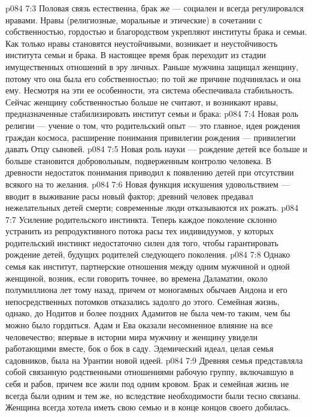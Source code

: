 \vs p084 7:3 Половая связь естественна, брак же --- социален и всегда регулировался нравами. Нравы (религиозные, моральные и этические) в сочетании с собственностью, гордостью и благородством укрепляют институты брака и семьи. Как только нравы становятся неустойчивыми, возникает и неустойчивость института семьи и брака. В настоящее время брак переходит из стадии имущественных отношений в эру личных. Раньше мужчина защищал женщину, потому что она была его собственностью; по той же причине подчинялась и она ему. Несмотря на эти ее особенности, эта система обеспечивала стабильность. Сейчас женщину собственностью больше не считают, и возникают нравы, предназначенные стабилизировать институт семьи и брака:
\vs p084 7:4 \bibnobreakspace Новая роль религии --- учение о том, что родительский опыт --- это главное, идея рождения граждан космоса, расширение понимания привилегии рождения --- привилегии давать Отцу сыновей.
\vs p084 7:5 \pc {}\bibnobreakspace Новая роль науки --- рождение детей все больше и больше становится добровольным, подверженным контролю человека. В древности недостаток понимания приводил к появлению детей при отсутствии всякого на то желания.
\vs p084 7:6 \pc {}\bibnobreakspace Новая функция искушения удовольствием --- вводит в выживание расы новый фактор; древний человек предавал нежелательных детей смерти; современные люди отказываются их рожать.
\vs p084 7:7 \pc {}\bibnobreakspace Усиление родительского инстинкта. Теперь каждое поколение склонно устранить из репродуктивного потока расы тех индивидуумов, у которых родительский инстинкт недостаточно силен для того, чтобы гарантировать рождение детей, будущих родителей следующего поколения.
\vs p084 7:8 \pc Однако семья как институт, партнерские отношения между одним мужчиной и одной женщиной, возник, если говорить точнее, во времена Даламатии, около полумиллиона лет тому назад, причем от моногамных обычаев Андона и его непосредственных потомков отказались задолго до этого. Семейная жизнь, однако, до Нодитов и более поздних Адамитов не была чем\hyp{}то таким, чем бы можно было гордиться. Адам и Ева оказали несомненное влияние на все человечество; впервые в истории мира мужчину и женщину увидели работающими вместе, бок о бок в саду. Эдемический идеал, целая семья садовников, была на Урантии новой идеей.
\vs p084 7:9 Древняя семья представляла собой связанную родственными отношениями рабочую группу, включавшую в себя и рабов, причем все жили под одним кровом. Брак и семейная жизнь не всегда были одним и тем же, но вследствие необходимости были тесно связаны. Женщина всегда хотела иметь свою семью и в конце концов своего добилась.
